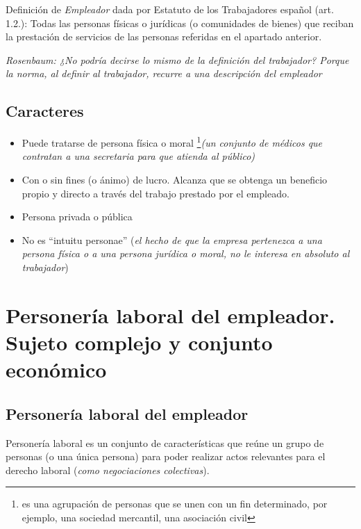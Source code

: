 \documentclass[spanish,12pt,a4paper,titlepage]{report}
\begin{document}
Definición de \textit{Empleador} dada por Estatuto de los Trabajadores español (art. 1.2.): Todas las personas físicas o jurídicas (o comunidades de bienes) que reciban la prestación de servicios de las personas referidas en el apartado anterior.

\textit{Rosenbaum: ¿No podría decirse lo mismo de la definición del trabajador?  Porque la norma, al definir al trabajador, recurre a una descripción del empleador}
 

\subsection{Caracteres}
\begin{itemize}
\item Puede tratarse de persona física o moral \footnote{es una agrupación de personas que se unen con un fin determinado, por ejemplo, una sociedad mercantil, una asociación civil}\textit{(un conjunto de médicos que contratan a una secretaria para que atienda al público)}
\item Con o sin fines (o ánimo) de lucro. Alcanza que se obtenga un beneficio propio y directo a través del trabajo prestado por el empleado.

\item Persona privada o pública

\item No es ``intuitu personae'' (\textit{el hecho de que la empresa pertenezca a una persona física o a una persona jurídica o moral, no le interesa en absoluto al trabajador})

\end{itemize}
\section{Personería laboral del empleador. Sujeto complejo y conjunto económico}
\subsection{Personería laboral del empleador}

Personería laboral es un conjunto de características que reúne un grupo de personas (o una única persona) para poder realizar actos relevantes para el derecho laboral (\textit{como negociaciones colectivas}).
\end{document}
